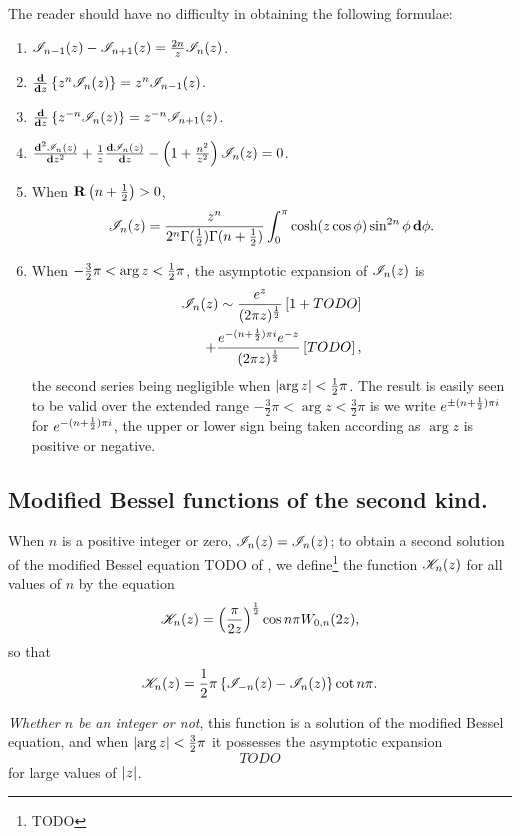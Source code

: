 \documentclass{book}
\begin{document}
The reader should have no difficulty in obtaining the following
formulae:
\begin{enumerate}
\item $\mathscr{I}_{n-1}(z) - \mathscr{I}_{n+1}(z) = \frac{2n}{z} \mathscr{I}_n(z)$.
\item $\frac{\mathbf{d}}{\mathbf{d} z} \left\{ z^n \mathscr{I}_n(z) \right\} = z^n \mathscr{I}_{n-1}(z)$.
\item $\frac{\mathbf{d}}{\mathbf{d} z} \left\{ z^{-n} \mathscr{I}_n(z) \right\} = z^{-n} \mathscr{I}_{n+1}(z)$.
\item $\frac{\mathbf{d}^2 \mathscr{I}_n(z)}{\mathbf{d} z^2} + \frac{1}{z} \frac{\mathbf{d}
    \mathscr{I}_n(z)}{\mathbf{d} z} -
  \left( 1 + \frac{n^2}{z^2} \right) \mathscr{I}_n(z) = 0$.
\item When $\operatorname{\mathbf{R}} \left( n + \frac{1}{2} \right) > 0$,
  $$
  \mathscr{I}_n(z)
  =
  \frac{z^n}{2^n \Gamma(\frac{1}{2}) \Gamma(n+\frac{1}{2})}
  \int_0^{\pi}
  \cosh (z\cos\phi) \sin^{2n} \phi \, \mathbf{d} \phi.
  $$
\item When $-\frac{3}{2}\pi < \arg z < \frac{1}{2} \pi$, the asymptotic
  expansion of $\mathscr{I}_n(z)$ is
  \begin{align*}
    \mathscr{I}_n(z)
    \sim
    \frac{ e^z}{ (2\pi z)^{\frac{1}{2}}}
    \left[ 1 + TODO \right]
    \\
    +
    \frac{ e^{-(n+\frac{1}{2}) \pi i} e^{-z}}{ (2\pi z)^{\frac{1}{2}} }
    \left[ TODO \right],
  \end{align*}
  the second series being negligible when $\left| \arg z \right| < \frac{1}{2}
  \pi$. The result is easily seen to be valid over the extended
  range $-\frac{3}{2} \pi < \arg z < \frac{3}{2} \pi$ is we write
  $e^{\pm (n+\frac{1}{2})\pi i}$ for $e^{-(n+\frac{1}{2})\pi i}$, the upper or
  lower sign being taken according as $\arg z$ is positive or negative.
\end{enumerate}

\subsection{Modified Bessel functions of the second kind.}
When $n$ is a positive integer or zero, $\mathscr{I}_n(z) = \mathscr{I}_n(z)$;
to obtain a second solution of the modified Bessel equation TODO
of , we define\footnote{TODO} the function
$\mathscr{K}_n(z)$ for all values of $n$ by the equation
$$
\mathscr{K}_n(z)
=
\left( \frac{\pi}{2z} \right)^{\frac{1}{2}}
\cos n\pi
W_{0,n}(2z),
$$
so that
$$
\mathscr{K}_n(z) = \frac{1}{2} \pi \left\{ \mathscr{I}_{-n}(z) - \mathscr{I}_n(z) \right\} \cot n\pi.
$$

% 
% 
\emph{Whether $n$ be an integer or not}, this function is a
solution of the modified Bessel equation, and when
$\left| \arg z \right| < \frac{3}{2} \pi$ it possesses the asymptotic
expansion
$$
TODO
$$
for large values of $\left| z \right|$.
\end{document}
